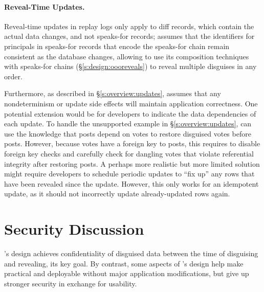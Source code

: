 
\paragraph{Reveal-Time Updates.}
\label{s:design:updates:limitations}
%
%

%
Reveal-time updates in replay logs only apply to diff records, which contain the actual
data changes, and not speaks-for records; \sys assumes that the identifiers for
principals in speaks-for records that encode the speaks-for chain remain
consistent as the database changes, allowing \sys to use its composition
techniques with speaks-for chains (\S\ref{s:design:oooreveals}) to reveal
multiple disguises in any order.
%

%
Furthermore, as described in \S\ref{s:overview:updates}, \sys assumes that
any nondeterminism or update side effects will maintain application
correctness.
%
One potential extension would be for developers to indicate the data
dependencies of each update. To handle the unsupported example in
\S\ref{s:overview:updates}, \sys can use the knowledge that posts depend on
votes to restore disguised votes before posts. However, because votes have a
foreign key to posts, this requires \sys to disable foreign key checks and
carefully check for dangling votes that violate referential integrity after
restoring posts.
%
A perhaps more realistic but more limited solution might require developers to
schedule periodic updates to ``fix up'' any rows that
have been revealed since the update. However, this only works for an idempotent
update, as it should not incorrectly update already-updated rows again.  
%


\section{Security Discussion}
\label{s:eval-security}


%
%
\sys's design achieves confidentiality of disguised data between the time of
disguising and revealing, its key goal.
%
By contrast, some aspects of \sys's design help make \sys practical and
deployable without major application modifications, but give up stronger
security in exchange for usability.
%

